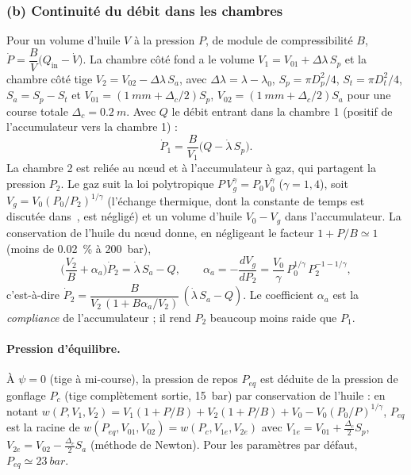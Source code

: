 \documentclass[11pt,a4paper]{article}
\newcommand{\dt}[1]{\dot{#1}}
\begin{document}
\subsubsection*{(b) Continuité du débit dans les chambres}
Pour un volume d'huile $V$ à la pression $P$, de module de compressibilité $B$, $\dt P=\dfrac{B}{V}\big(Q_{\text{in}}-\dt V\big)$. La chambre côté fond a le volume $V_1=V_{01}+\Delta\lambda\,S_p$ et la chambre côté tige $V_2=V_{02}-\Delta\lambda\,S_a$, avec $\Delta\lambda=\lambda-\lambda_0$, $S_p=\pi D_p^2/4$, $S_t=\pi D_t^2/4$, $S_a=S_p-S_t$ et $V_{01}=(\SI{1}{mm}+\Delta_c/2)S_p$, $V_{02}=(\SI{1}{mm}+\Delta_c/2)S_a$ pour une course totale $\Delta_c=\SI{0,2}{m}$. Avec $Q$ le débit entrant dans la chambre 1 (positif de l'accumulateur vers la chambre 1) :
\begin{equation}
 \dt P_1=\frac{B}{V_1}\big(Q-\dt\lambda\,S_p\big).
\end{equation}
La chambre 2 est reliée au n\oe ud et à l'accumulateur à gaz, qui partagent la pression $P_2$. Le gaz suit la loi polytropique $P\,V_g^{\gamma}=P_0V_0^{\gamma}$ ($\gamma=1{,}4$), soit $V_g=V_0(P_0/P_2)^{1/\gamma}$ (l'échange thermique, dont la constante de temps est discutée dans~\cite{Pourmovahed1990}, est négligé) et un volume d'huile $V_0-V_g$ dans l'accumulateur. La conservation de l'huile du n\oe ud donne, en négligeant le facteur $1+P/B\simeq1$ (moins de \SI{0,02}{\%} à \SI{200}{bar}),
\begin{equation}
 \Big(\frac{V_2}{B}+\alpha_a\Big)\dt P_2=\dt\lambda\,S_a-Q,\qquad
 \alpha_a=-\frac{dV_g}{dP_2}=\frac{V_0}{\gamma}\,P_0^{1/\gamma}\,P_2^{-1-1/\gamma},
\end{equation}
c'est-à-dire $\dt P_2=\dfrac{B}{V_2\,(1+B\alpha_a/V_2)}\,(\dt\lambda\,S_a-Q)$. Le coefficient $\alpha_a$ est la \emph{compliance} de l'accumulateur ; il rend $P_2$ beaucoup moins raide que $P_1$.

\paragraph{Pression d'équilibre.} À $\psi=0$ (tige à mi-course), la pression de repos $P_{eq}$ est déduite de la pression de gonflage $P_c$ (tige complètement sortie, \SI{15}{bar}) par conservation de l'huile : en notant $w(P,V_1,V_2)=V_1(1+P/B)+V_2(1+P/B)+V_0-V_0(P_0/P)^{1/\gamma}$, $P_{eq}$ est la racine de $w(P_{eq},V_{01},V_{02})=w(P_c,V_{1e},V_{2e})$ avec $V_{1e}=V_{01}+\tfrac{\Delta_c}2S_p$, $V_{2e}=V_{02}-\tfrac{\Delta_c}2S_a$ (méthode de Newton). Pour les paramètres par défaut, $P_{eq}\simeq\SI{23}{bar}$.
\end{document}
